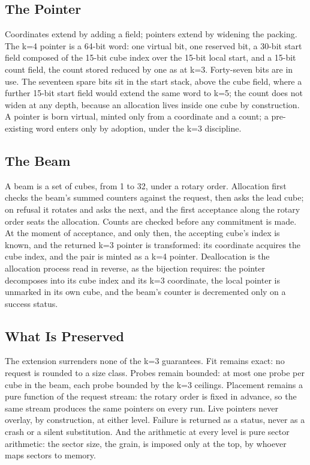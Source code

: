 \documentclass{article}
\begin{document}
\subsection{The Pointer}

Coordinates extend by adding a field; pointers extend by widening the packing. The k=4 pointer is a 64-bit word: one virtual bit, one reserved bit, a 30-bit start field composed of the 15-bit cube index over the 15-bit local start, and a 15-bit count field, the count stored reduced by one as at k=3. Forty-seven bits are in use. The seventeen spare bits sit in the start stack, above the cube field, where a further 15-bit start field would extend the same word to k=5; the count does not widen at any depth, because an allocation lives inside one cube by construction. A pointer is born virtual, minted only from a coordinate and a count; a pre-existing word enters only by adoption, under the k=3 discipline.

\subsection{The Beam}

A beam is a set of cubes, from 1 to 32, under a rotary order. Allocation first checks the beam's summed counters against the request, then asks the lead cube; on refusal it rotates and asks the next, and the first acceptance along the rotary order seats the allocation. Counts are checked before any commitment is made. At the moment of acceptance, and only then, the accepting cube's index is known, and the returned k=3 pointer is transformed: its coordinate acquires the cube index, and the pair is minted as a k=4 pointer. Deallocation is the allocation process read in reverse, as the bijection requires: the pointer decomposes into its cube index and its k=3 coordinate, the local pointer is unmarked in its own cube, and the beam's counter is decremented only on a success status.

\subsection{What Is Preserved}

The extension surrenders none of the k=3 guarantees. Fit remains exact: no request is rounded to a size class. Probes remain bounded: at most one probe per cube in the beam, each probe bounded by the k=3 ceilings. Placement remains a pure function of the request stream: the rotary order is fixed in advance, so the same stream produces the same pointers on every run. Live pointers never overlay, by construction, at either level. Failure is returned as a status, never as a crash or a silent substitution. And the arithmetic at every level is pure sector arithmetic: the sector size, the grain, is imposed only at the top, by whoever maps sectors to memory.
\end{document}
